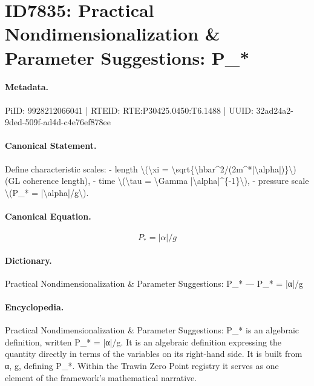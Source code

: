 \section*{ID7835: Practical Nondimensionalization \& Parameter Suggestions: P\_*}
\paragraph{Metadata.}
PiID: 9928212066041 | RTEID: RTE:P30425.0450:T6.1488 | UUID: 32ad24a2-9ded-509f-ad4d-c4e76ef878ee

\paragraph{Canonical Statement.}
Define characteristic scales: - length \textbackslash{}(\textbackslash{}xi = \textbackslash{}sqrt\{\textbackslash{}hbar\textasciicircum{}2/(2m\textasciicircum{}*|\textbackslash{}alpha|)\}\textbackslash{}) (GL coherence length), - time \textbackslash{}(\textbackslash{}tau = \textbackslash{}Gamma |\textbackslash{}alpha|\textasciicircum{}\{-1\}\textbackslash{}), - pressure scale \textbackslash{}(P\_* = |\textbackslash{}alpha|/g\textbackslash{}).

\paragraph{Canonical Equation.}
\[
P_* = |\alpha|/g
\]

\paragraph{Dictionary.}
Practical Nondimensionalization \& Parameter Suggestions: P\_* — P\_* = |α|/g

\paragraph{Encyclopedia.}
Practical Nondimensionalization \& Parameter Suggestions: P\_* is an algebraic definition, written P\_* = |α|/g. It is an algebraic definition expressing the quantity directly in terms of the variables on its right-hand side. It is built from α, g, defining P\_*. Within the Trawin Zero Point registry it serves as one element of the framework's mathematical narrative.
